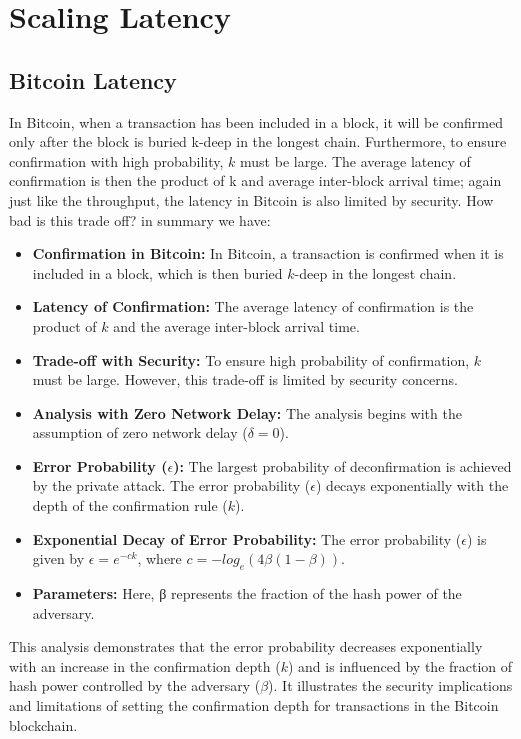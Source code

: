 \chapter{Scaling Latency}

\section{Bitcoin Latency}
In Bitcoin, when a transaction has been included in a block, it will be confirmed only after the block is buried k-deep in the longest chain. Furthermore, to ensure confirmation with high probability, $k$ must be large. The average latency of confirmation is then the product of k and average inter-block arrival time; again just like the throughput, the latency in Bitcoin is also limited by security. How bad is this trade oﬀ? in summary we have:
\begin{itemize}
	\item \textbf{Confirmation in Bitcoin:} In Bitcoin, a transaction is confirmed when it is included in a block, which is then buried $k$-deep in the longest chain.
	\item \textbf{Latency of Confirmation:}  The average latency of confirmation is the product of $k$ and the average inter-block arrival time.
	\item \textbf{Trade-off with Security:} To ensure high probability of confirmation, $k$ must be large. However, this trade-off is limited by security concerns.
	\item \textbf{Analysis with Zero Network Delay:} The analysis begins with the assumption of zero network delay ($\delta = 0$).
	\item \textbf{Error Probability ($\epsilon$): }  The largest probability of deconfirmation is achieved by the private attack. The error probability ($\epsilon$) decays exponentially with the depth of the confirmation rule ($k$).
	\item  \textbf{Exponential Decay of Error Probability:} The error probability ($\epsilon$) is given by $\epsilon = e^{-ck}$, where $c = - log_{e}(4\beta(1 - \beta))$.
	\item \textbf{Parameters:} Here, β represents the fraction of the hash power of the adversary.
\end{itemize}
This analysis demonstrates that the error probability decreases exponentially with an increase in the confirmation depth ($k$) and is influenced by the fraction of hash power controlled by the adversary ($\beta$). It illustrates the security implications and limitations of setting the confirmation depth for transactions in the Bitcoin blockchain.
